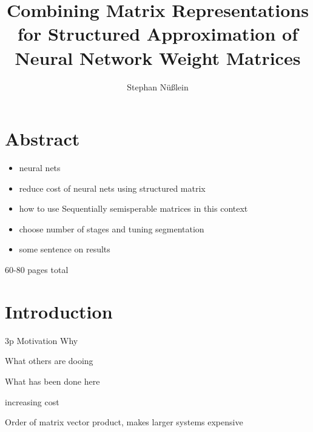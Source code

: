 \documentclass[doctype=mastersthesis,BCOR=15mm,biblatex]{ldvbook}%
\begin{document}
\title{Combining Matrix Representations for Structured Approximation of Neural Network Weight Matrices}
\author{Stephan Nüßlein}


\maketitle[frontcover=Design1]


\chapter*{Abstract}

\begin{itemize}
	\item neural nets
	\item reduce cost of neural nets using structured matrix
	\item how to use Sequentially semisperable matrices in this context
	\item choose number of stages and tuning segmentation
	\item some sentence on results
\end{itemize}


\tableofcontents

60-80 pages total






\chapter{Introduction} 3p
Motivation Why

What others are dooing

What has been done here

increasing cost

Order of matrix vector product, makes larger systems expensive
\end{document}
